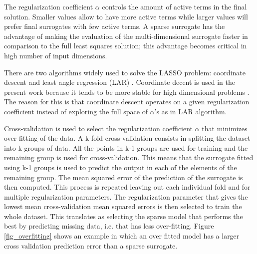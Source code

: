 \documentclass[preprint,12pt]{elsarticle}
\begin{document}
The regularization coefficient $\alpha$ controls the amount of active terms in the final solution. Smaller values allow to have more active terms while larger values will prefer final surrogates with few active terms. A sparse surrogate has the advantage of making the evaluation of the multi-dimensional surrogate faster in comparison to the full least squares solution; this advantage becomes critical in high number of input dimensions.

There are two algorithms widely used to solve the LASSO problem: coordinate descent \cite{tibshirani1996regression} and least angle regression (LAR) \cite{blatman2011adaptive}. Coordinate decent is used in the present work because it tends to be more stable for high dimensional problems \cite{pedregosa2011scikit}. The reason for this is that coordinate descent operates on a given regularization coefficient instead of exploring the full space of $\alpha$'s as in LAR algorithm.


Cross-validation is used to select the regularization coefficient $\alpha$ that minimizes over fitting of the data. A k-fold cross-validation consists in splitting the dataset into k groups of data. All the points in k-1 groups are used for training and the remaining group is used for cross-validation. This means that the surrogate fitted using k-1 groups is used to predict the output in each of the elements of the remaining group. The mean squared error of the prediction of the surrogate is then computed. This process is repeated leaving out each individual fold and for multiple regularization parameters. The regularization parameter that gives the lowest mean cross-validation mean squared errors is then selected to train the whole dataset. This translates as selecting the sparse model that performs the best by predicting missing data, i.e. that has less over-fitting. Figure \ref{fig_overfitting} shows an example in which an over fitted model has a larger cross validation prediction error than a sparse surrogate.
\end{document}
